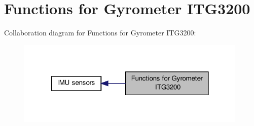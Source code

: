 \hypertarget{group__gyr}{\section{Functions for Gyrometer I\-T\-G3200}
\label{group__gyr}
}
Collaboration diagram for Functions for Gyrometer I\-T\-G3200\-:
\nopagebreak
\begin{figure}[H]
\begin{center}
\leavevmode
\includegraphics[width=312pt]{group__gyr}
\end{center}
\end{figure}
